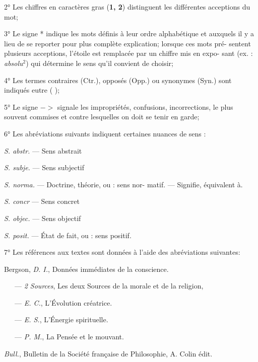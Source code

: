 \vspace{0.211cm}
2° Les chiffres en caractères gras ({\bf 1, 2}) distinguent les différentes acceptions
du mot;

3° Le signe * indique les mots définis à leur ordre alphabétique et auxquels
il y a lieu de se reporter pour plus complète explication; lorsque ces mots pré-
sentent plusieurs acceptions, l'étoile est remplacée par un chiffre mis en expo-
sant (ex. : {\it absolu}$^2$) qui détermine le sens qu'il convient de choisir;

4° Les termes contraires (Ctr.), opposés (Opp.) ou synonymes (Syn.) sont
indiqués eutre ( );

5° Le signe $->$
signale les impropriétés, confusions, incorrections, le plus
souvent commises et contre lesquelles on doit se tenir en garde;

6° Les abréviations suivants indiquent certaines nuances de sens :

\hfill
\begin{minipage}[c]{.45\linewidth}
\textsf{\textit {S. abstr.}} — Sens abstrait

\textsf{\textit {S. subje.}} — Sens subjectif

\textsf{\textit {S. norma.}} — Doctrine, théorie, ou : sens nor-   
matif. — Signifie, équivalent à.
\end{minipage}
\hfill
\begin{minipage}[c]{.45\linewidth}
\textsf{\textit {S. concr}} — Sens concret

\textsf{\textit {S. objec.}} — Sens objectif

\textsf{\textit {S. posit.}} — État de fait, ou : sens positif.
\end{minipage}

\vspace{0.211cm}

7° Les références aux textes sont données à l’aide des abréviations suivantes:

Bergson, {\it D. I.}, Données immédiates de la conscience.

\ \ \ — {\it 2 Sources}, Les deux Sources de la morale et de la religion,

\ \ \ — {\it E. C.}, L'Évolution créatrice.

\ \ \ — {\it E. S.}, L'Énergie spirituelle.

\ \ \ — {\it P. M.}, La Pensée et le mouvant.

{\it Bull.}, Bulletin de la Société française de Philosophie, A. Colin édit.

